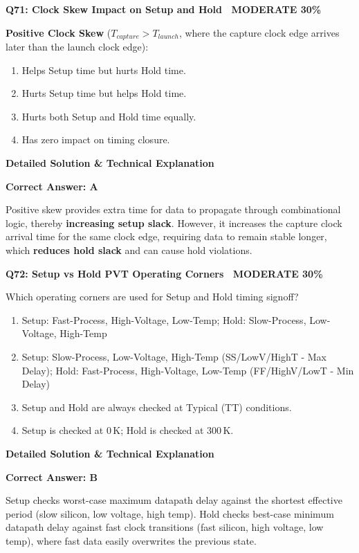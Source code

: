\documentclass[11pt,a4paper]{article}
\newcommand{\badgemod}{{\color{white}\colorbox{modoran}{\bfseries\sffamily\tiny\ MODERATE 30\%\ }}}
\newenvironment{qbox}[2]{%
  \begin{mdframed}[style=qstyle]%
  {\bfseries\sffamily\color{primaryblue}#1 \hfill #2}\par\vspace{2pt}%
}{%
  \end{mdframed}%
}
\newenvironment{ansbox}{%
  \begin{mdframed}[style=ansstyle]%
  {\bfseries\sffamily\color{ansgreen}\small Detailed Solution \& Technical Explanation}\par\vspace{2pt}\small%
}{%
  \end{mdframed}%
}
\begin{document}
\begin{qbox}{Q71: Clock Skew Impact on Setup and Hold}{\badgemod}
\textbf{Positive Clock Skew} ($T_{capture} > T_{launch}$, where the capture clock edge arrives later than the launch clock edge):
\begin{enumerate}[label=\textbf{\Alph*.}]
  \item Helps Setup time but hurts Hold time.
  \item Hurts Setup time but helps Hold time.
  \item Hurts both Setup and Hold time equally.
  \item Has zero impact on timing closure.
\end{enumerate}
\end{qbox}
\begin{ansbox}
\textbf{Correct Answer: A}

Positive skew provides extra time for data to propagate through combinational logic, thereby \textbf{increasing setup slack}. However, it increases the capture clock arrival time for the same clock edge, requiring data to remain stable longer, which \textbf{reduces hold slack} and can cause hold violations.
\end{ansbox}

\begin{qbox}{Q72: Setup vs Hold PVT Operating Corners}{\badgemod}
Which operating corners are used for Setup and Hold timing signoff?
\begin{enumerate}[label=\textbf{\Alph*.}]
  \item Setup: Fast-Process, High-Voltage, Low-Temp; Hold: Slow-Process, Low-Voltage, High-Temp
  \item Setup: Slow-Process, Low-Voltage, High-Temp (SS/LowV/HighT - Max Delay); Hold: Fast-Process, High-Voltage, Low-Temp (FF/HighV/LowT - Min Delay)
  \item Setup and Hold are always checked at Typical (TT) conditions.
  \item Setup is checked at $0\,\text{K}$; Hold is checked at $300\,\text{K}$.
\end{enumerate}
\end{qbox}
\begin{ansbox}
\textbf{Correct Answer: B}

Setup checks worst-case maximum datapath delay against the shortest effective period (slow silicon, low voltage, high temp). Hold checks best-case minimum datapath delay against fast clock transitions (fast silicon, high voltage, low temp), where fast data easily overwrites the previous state.
\end{ansbox}
\end{document}
